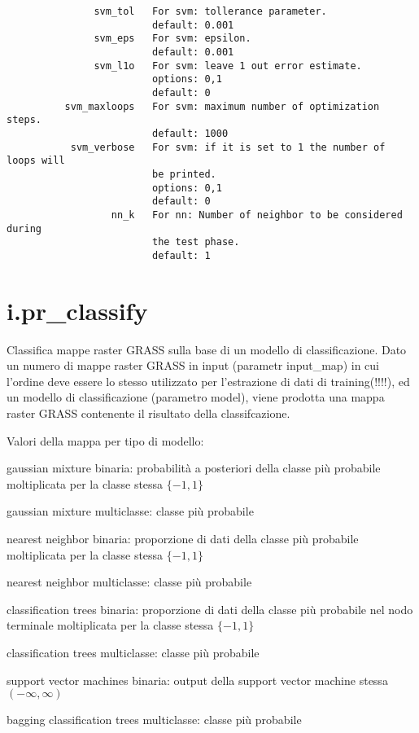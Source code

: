 \begin{verbatim}
               svm_tol   For svm: tollerance parameter.
                         default: 0.001
               svm_eps   For svm: epsilon.
                         default: 0.001
               svm_l1o   For svm: leave 1 out error estimate.
                         options: 0,1
                         default: 0
          svm_maxloops   For svm: maximum number of optimization steps.
                         default: 1000
           svm_verbose   For svm: if it is set to 1 the number of loops will 
                         be printed.
                         options: 0,1
                         default: 0
                  nn_k   For nn: Number of neighbor to be considered during 
                         the test phase.
                         default: 1
\end{verbatim}


\section*{i.pr\_classify}
Classifica mappe raster GRASS sulla base di un modello di
classificazione. Dato un numero di mappe raster GRASS in input
(parametr input\_map) in cui l'ordine deve essere lo stesso utilizzato
per l'estrazione di dati di training(!!!!), ed un modello di
classificazione (parametro model), viene prodotta una mappa raster
GRASS contenente il risultato della classifcazione.

Valori della mappa per tipo di modello:

\noindent
gaussian mixture binaria: probabilit\`{a} a posteriori della classe pi\`{u} probabile moltiplicata per la classe stessa $\{-1,1\}$

\noindent
gaussian mixture multiclasse: classe pi\`{u} probabile

\noindent
nearest neighbor binaria: proporzione di dati della classe pi\`{u} probabile moltiplicata per la classe stessa $\{-1,1\}$

\noindent
nearest neighbor multiclasse: classe pi\`{u} probabile

\noindent
classification trees binaria: proporzione di dati della classe pi\`{u} probabile nel nodo terminale moltiplicata per la classe stessa $\{-1,1\}$

\noindent
classification trees multiclasse: classe pi\`{u} probabile

\noindent
support vector machines binaria: output della support vector machine stessa $(-\infty,\infty)$

\noindent
bagging classification trees multiclasse: classe pi\`{u} probabile

